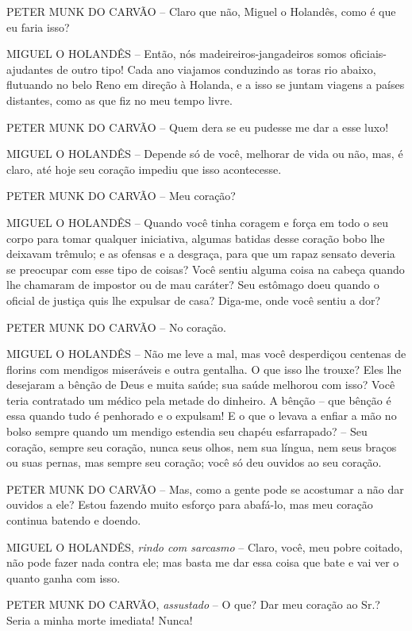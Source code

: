 PETER MUNK DO CARVÃO -- Claro que não, Miguel o Holandês, como é que eu
faria isso?

MIGUEL O HOLANDÊS -- Então, nós madeireiros-jangadeiros somos
oficiais-ajudantes de outro tipo! Cada ano viajamos conduzindo as toras
rio abaixo, flutuando no belo Reno em direção à Holanda, e a isso se
juntam viagens a países distantes, como as que fiz no meu tempo livre.

PETER MUNK DO CARVÃO -- Quem dera se eu pudesse me dar a esse luxo!

MIGUEL O HOLANDÊS -- Depende só de você, melhorar de vida ou não, mas, é
claro, até hoje seu coração impediu que isso acontecesse.

PETER MUNK DO CARVÃO -- Meu coração?

MIGUEL O HOLANDÊS -- Quando você tinha coragem e força em todo o seu
corpo para tomar qualquer iniciativa, algumas batidas desse coração bobo
lhe deixavam trêmulo; e as ofensas e a desgraça, para que um rapaz
sensato deveria se preocupar com esse tipo de coisas? Você sentiu alguma
coisa na cabeça quando lhe chamaram de impostor ou de mau caráter? Seu
estômago doeu quando o oficial de justiça quis lhe expulsar de casa?
Diga-me, onde você sentiu a dor?

PETER MUNK DO CARVÃO -- No coração.

MIGUEL O HOLANDÊS -- Não me leve a mal, mas você desperdiçou centenas de
florins com mendigos miseráveis e outra gentalha. O que isso lhe trouxe?
Eles lhe desejaram a bênção de Deus e muita saúde; sua saúde melhorou
com isso? Você teria contratado um médico pela metade do dinheiro. A
bênção -- que bênção é essa quando tudo é penhorado e o expulsam! E o
que o levava a enfiar a mão no bolso sempre quando um mendigo estendia
seu chapéu esfarrapado? -- Seu coração, sempre seu coração, nunca seus
olhos, nem sua língua, nem seus braços ou suas pernas, mas sempre seu
coração; você só deu ouvidos ao seu coração.

PETER MUNK DO CARVÃO -- Mas, como a gente pode se acostumar a não dar
ouvidos a ele? Estou fazendo muito esforço para abafá-lo, mas meu
coração continua batendo e doendo.

MIGUEL O HOLANDÊS, \emph{rindo com sarcasmo} -- Claro, você, meu pobre
coitado, não pode fazer nada contra ele; mas basta me dar essa coisa que
bate e vai ver o quanto ganha com isso.

PETER MUNK DO CARVÃO, \emph{assustado} -- O que? Dar meu coração ao Sr.?
Seria a minha morte imediata! Nunca!

